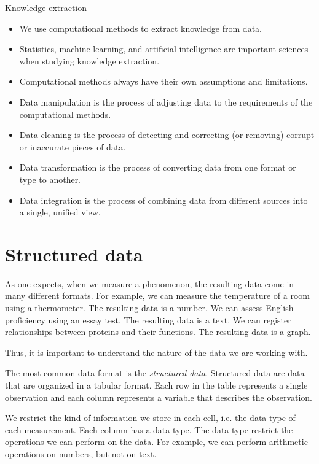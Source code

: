 \begin{slidebox}{Knowledge extraction}{}
  \begin{itemize}
    \item We use computational methods to extract knowledge from data.
    \item Statistics, machine learning, and artificial intelligence are important
      sciences when studying knowledge extraction.
    \item Computational methods always have their own assumptions and limitations.
    \item Data manipulation is the process of adjusting data to the requirements of the
      computational methods.
    \item Data cleaning is the process of detecting and correcting (or removing) corrupt
      or inaccurate pieces of data.
    \item Data transformation is the process of converting data from one format or type
      to another.
    \item Data integration is the process of combining data from different sources into
      a single, unified view.
  \end{itemize}
\end{slidebox}

\section{Structured data}

As one expects, when we measure a phenomenon, the resulting data come in many different
formats.  For example, we can measure the temperature of a room using a thermometer.  The
resulting data is a number.  We can assess English proficiency using an essay test.  The
resulting data is a text.  We can register relationships between proteins and
their functions.  The resulting data is a graph.

Thus, it is important to understand the nature of the data we are working with.

The most common data format is the \emph{structured data}.  Structured data are data that
are organized in a tabular format.  Each row in the table represents a single observation
and each column represents a variable that describes the observation.

We restrict the kind of information we store in each cell, i.e. the data type of each
measurement.  Each column has a data type.  The data type restrict the operations we can
perform on the data.  For example, we can perform arithmetic operations on numbers, but
not on text.

